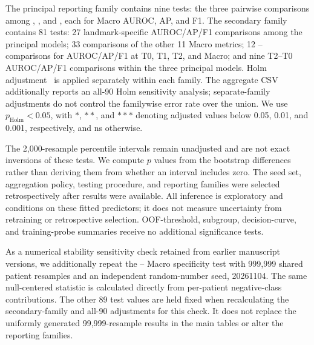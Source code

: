 The principal reporting family contains nine tests: the three pairwise comparisons among \nojepa{}, \direct{}, and \fullmodel{}, each for Macro AUROC, AP, and F1. The secondary family contains 81 tests: 27 landmark-specific AUROC/AP/F1 comparisons among the principal models; 33 comparisons of the other 11 Macro metrics; 12 \fullmodel{}--\meanmodel{} comparisons for AUROC/AP/F1 at T0, T1, T2, and Macro; and nine T2--T0 AUROC/AP/F1 comparisons within the three principal models. Holm adjustment~\citep{holm1979} is applied separately within each family. The aggregate CSV additionally reports an all-90 Holm sensitivity analysis; separate-family adjustments do not control the familywise error rate over the union. We use $p_{\mathrm{Holm}}<0.05$, with $*$, $**$, and $***$ denoting adjusted values below 0.05, 0.01, and 0.001, respectively, and ns otherwise.

The 2,000-resample percentile intervals remain unadjusted and are not exact inversions of these tests. We compute $p$ values from the bootstrap differences rather than deriving them from whether an interval includes zero. The seed set, aggregation policy, testing procedure, and reporting families were selected retrospectively after results were available. All inference is exploratory and conditions on these fitted predictors; it does not measure uncertainty from retraining or retrospective selection. OOF-threshold, subgroup, decision-curve, and training-probe summaries receive no additional significance tests.


As a numerical stability sensitivity check retained from earlier manuscript versions, we additionally repeat the \fullmodel{}--\direct{} Macro specificity test with 999,999 shared patient resamples and an independent random-number seed, 20261104. The same null-centered statistic is calculated directly from per-patient negative-class contributions. The other 89 test values are held fixed when recalculating the secondary-family and all-90 adjustments for this check. It does not replace the uniformly generated 99,999-resample results in the main tables or alter the reporting families.

